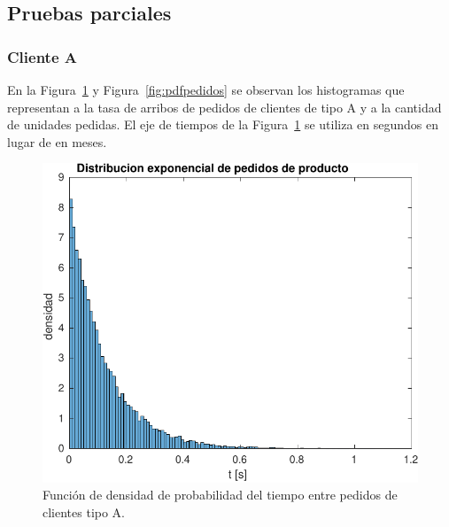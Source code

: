 \documentclass[10pt]{article}
\begin{document}
\subsection{Pruebas parciales}

\subsubsection{Cliente A}

En la Figura~\ref{fig:pdftiempo} y Figura~\ref{fig:pdfpedidos} se observan los histogramas que representan a la tasa de arribos de pedidos de clientes de tipo A y a la cantidad de unidades pedidas. El eje de tiempos de la Figura~\ref{fig:pdftiempo} se utiliza en segundos en lugar de en meses.

\begin{figure}
\centering
\includegraphics[scale=1]{img/pdf_tiempo_pedidos}
\caption{Función de densidad de probabilidad del tiempo entre pedidos de clientes tipo A.}
\label{fig:pdftiempo}
\end{figure}
\end{document}
